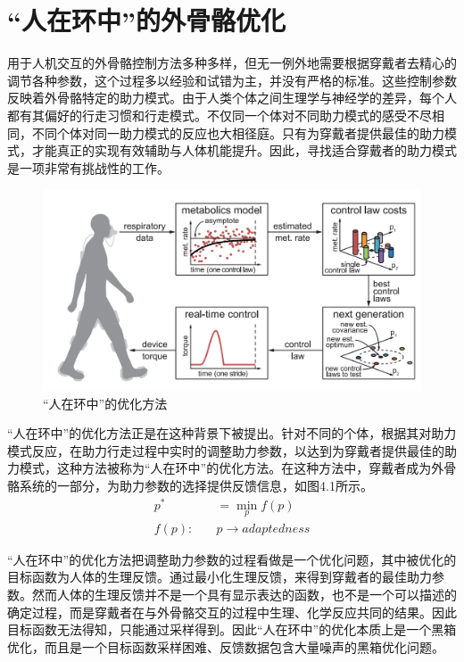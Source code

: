 \chapter{“人在环中”的外骨骼优化}

用于人机交互的外骨骼控制方法多种多样，但无一例外地需要根据穿戴者去精心的调节各种参数，这个过程多以经验和试错为主，并没有严格的标准。这些控制参数反映着外骨骼特定的助力模式。由于人类个体之间生理学与神经学的差异，每个人都有其偏好的行走习惯和行走模式。不仅同一个体对不同助力模式的感受不尽相同，不同个体对同一助力模式的反应也大相径庭。只有为穿戴者提供最佳的助力模式，才能真正的实现有效辅助与人体机能提升。因此，寻找适合穿戴者的助力模式是一项非常有挑战性的工作。

\begin{figure}[!htb]
    \includegraphics[width=15cm]{fig/f60.jpg}
    \caption{“人在环中”的优化方法\cite{p40}}
    \label{fig:mark}
\end{figure}

“人在环中”的优化方法正是在这种背景下被提出。针对不同的个体，根据其对助力模式反应，在助力行走过程中实时的调整助力参数，以达到为穿戴者提供最佳的助力模式，这种方法被称为“人在环中”的优化方法。在这种方法中，穿戴者成为外骨骼系统的一部分，为助力参数的选择提供反馈信息，如图4.1所示。
\begin{align}
    p^{*} & = \mathop{min}\limits_{p} f(p) \\
    f(p):\quad &p \to adaptedness
\end{align}

“人在环中”的优化方法把调整助力参数的过程看做是一个优化问题，其中被优化的目标函数为人体的生理反馈。通过最小化生理反馈，来得到穿戴者的最佳助力参数。然而人体的生理反馈并不是一个具有显示表达的函数，也不是一个可以描述的确定过程，而是穿戴者在与外骨骼交互的过程中生理、化学反应共同的结果。因此目标函数无法得知，只能通过采样得到。因此“人在环中”的优化本质上是一个黑箱优化，而且是一个目标函数采样困难、反馈数据包含大量噪声的黑箱优化问题。

